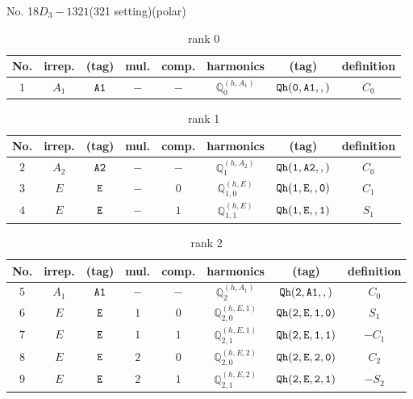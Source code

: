 \documentclass[fleqn,8pt]{jsarticle}
\begin{document}
\setcounter{MaxMatrixCols}{16}

\begin{center}
\LARGE
No. 18\quad$D_{3}-1$\quad$321$\quad(321 setting)\quad[ trigonal ] (polar)
\end{center}
\begin{table}[ht!]
\begin{center}
\caption{rank 0}
\renewcommand{\arraystretch}{1.3}
\begin{tabular}{cccccccc} \hline \hline
No. & irrep. & (tag) & mul. & comp. & harmonics & (tag) & definition \\ \hline
$ 1 $ & $ A_{1} $ & $ {\tt A1} $ & $ - $ & $ - $ & $ \mathbb{Q}_{0}^{(h,A_{1})} $ & $ {\tt Qh(0,A1,,)} $ & $ C_{0} $ \\
 \hline \hline
\end{tabular}
\end{center}
\end{table}
\begin{table}[ht!]
\begin{center}
\caption{rank 1}
\renewcommand{\arraystretch}{1.3}
\begin{tabular}{cccccccc} \hline \hline
No. & irrep. & (tag) & mul. & comp. & harmonics & (tag) & definition \\ \hline
$ 2 $ & $ A_{2} $ & $ {\tt A2} $ & $ - $ & $ - $ & $ \mathbb{Q}_{1}^{(h,A_{2})} $ & $ {\tt Qh(1,A2,,)} $ & $ C_{0} $ \\
$ 3 $ & $ E $ & $ {\tt E} $ & $ - $ & $ 0 $ & $ \mathbb{Q}_{1,0}^{(h,E)} $ & $ {\tt Qh(1,E,,0)} $ & $ C_{1} $ \\
$ 4 $ & $ E $ & $ {\tt E} $ & $ - $ & $ 1 $ & $ \mathbb{Q}_{1,1}^{(h,E)} $ & $ {\tt Qh(1,E,,1)} $ & $ S_{1} $ \\
 \hline \hline
\end{tabular}
\end{center}
\end{table}
\begin{table}[ht!]
\begin{center}
\caption{rank 2}
\renewcommand{\arraystretch}{1.3}
\begin{tabular}{cccccccc} \hline \hline
No. & irrep. & (tag) & mul. & comp. & harmonics & (tag) & definition \\ \hline
$ 5 $ & $ A_{1} $ & $ {\tt A1} $ & $ - $ & $ - $ & $ \mathbb{Q}_{2}^{(h,A_{1})} $ & $ {\tt Qh(2,A1,,)} $ & $ C_{0} $ \\
$ 6 $ & $ E $ & $ {\tt E} $ & $ 1 $ & $ 0 $ & $ \mathbb{Q}_{2,0}^{(h,E,1)} $ & $ {\tt Qh(2,E,1,0)} $ & $ S_{1} $ \\
$ 7 $ & $ E $ & $ {\tt E} $ & $ 1 $ & $ 1 $ & $ \mathbb{Q}_{2,1}^{(h,E,1)} $ & $ {\tt Qh(2,E,1,1)} $ & $ - C_{1} $ \\
$ 8 $ & $ E $ & $ {\tt E} $ & $ 2 $ & $ 0 $ & $ \mathbb{Q}_{2,0}^{(h,E,2)} $ & $ {\tt Qh(2,E,2,0)} $ & $ C_{2} $ \\
$ 9 $ & $ E $ & $ {\tt E} $ & $ 2 $ & $ 1 $ & $ \mathbb{Q}_{2,1}^{(h,E,2)} $ & $ {\tt Qh(2,E,2,1)} $ & $ - S_{2} $ \\
 \hline \hline
\end{tabular}
\end{center}
\end{table}
\end{document}
